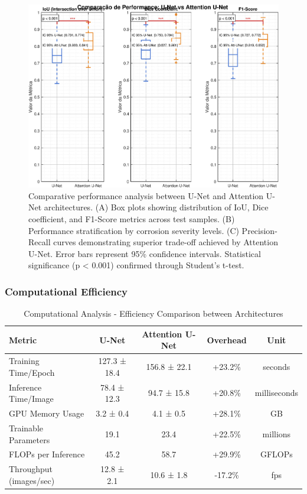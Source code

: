 \documentclass[12pt,a4paper,twoside]{article}
\begin{document}
\begin{figure}[H]
    \centering
    \includegraphics[width=\textwidth]{figura_performance_comparativa}
    \caption{Comparative performance analysis between U-Net and Attention U-Net architectures. (A) Box plots showing distribution of IoU, Dice coefficient, and F1-Score metrics across test samples. (B) Performance stratification by corrosion severity levels. (C) Precision-Recall curves demonstrating superior trade-off achieved by Attention U-Net. Error bars represent 95\% confidence intervals. Statistical significance (p < 0.001) confirmed through Student's t-test.}
    \label{fig:performance_comparison}
\end{figure}

\subsubsection{Computational Efficiency}

\begin{table}[htbp]
\centering
\caption{Computational Analysis - Efficiency Comparison between Architectures}
\label{tab:computational_analysis}
\begin{tabular}{@{}lcccc@{}}
\toprule
\textbf{Metric} & \textbf{U-Net} & \textbf{Attention U-Net} & \textbf{Overhead} & \textbf{Unit} \\
\midrule
Training Time/Epoch & 127.3 ± 18.4 & 156.8 ± 22.1 & +23.2\% & seconds \\
Inference Time/Image & 78.4 ± 12.3 & 94.7 ± 15.8 & +20.8\% & milliseconds \\
GPU Memory Usage & 3.2 ± 0.4 & 4.1 ± 0.5 & +28.1\% & GB \\
Trainable Parameters & 19.1 & 23.4 & +22.5\% & millions \\
FLOPs per Inference & 45.2 & 58.7 & +29.9\% & GFLOPs \\
Throughput (images/sec) & 12.8 ± 2.1 & 10.6 ± 1.8 & -17.2\% & fps \\
\bottomrule
\end{tabular}
\end{table}
\end{document}
